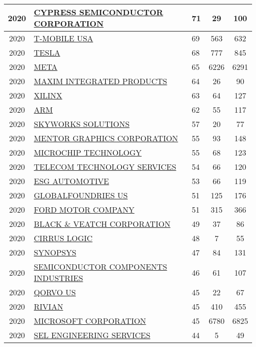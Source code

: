 \documentclass{article}%
\begin{document}
\begin{longtable}{c|p{20em}|p{5em}|c|c}
\hline%
2020&\hyperref[subsec:CYPRESSSEMICONDUCTORCORPORATION]{CYPRESS SEMICONDUCTOR CORPORATION}&71&29&100\\%
\hline%
2020&\hyperref[subsec:T{-}MOBILEUSA]{T{-}MOBILE USA}&69&563&632\\%
\hline%
2020&\hyperref[subsec:TESLA]{TESLA}&68&777&845\\%
\hline%
2020&\hyperref[subsec:META]{META}&65&6226&6291\\%
\hline%
2020&\hyperref[subsec:MAXIMINTEGRATEDPRODUCTS]{MAXIM INTEGRATED PRODUCTS}&64&26&90\\%
\hline%
2020&\hyperref[subsec:XILINX]{XILINX}&63&64&127\\%
\hline%
2020&\hyperref[subsec:ARM]{ARM}&62&55&117\\%
\hline%
2020&\hyperref[subsec:SKYWORKSSOLUTIONS]{SKYWORKS SOLUTIONS}&57&20&77\\%
\hline%
2020&\hyperref[subsec:MENTORGRAPHICSCORPORATION]{MENTOR GRAPHICS CORPORATION}&55&93&148\\%
\hline%
2020&\hyperref[subsec:MICROCHIPTECHNOLOGY]{MICROCHIP TECHNOLOGY}&55&68&123\\%
\hline%
2020&\hyperref[subsec:TELECOMTECHNOLOGYSERVICES]{TELECOM TECHNOLOGY SERVICES}&54&66&120\\%
\hline%
2020&\hyperref[subsec:ESGAUTOMOTIVE]{ESG AUTOMOTIVE}&53&66&119\\%
\hline%
2020&\hyperref[subsec:GLOBALFOUNDRIESUS]{GLOBALFOUNDRIES US}&51&125&176\\%
\hline%
2020&\hyperref[subsec:FORDMOTORCOMPANY]{FORD MOTOR COMPANY}&51&315&366\\%
\hline%
2020&\hyperref[subsec:BLACKVEATCHCORPORATION]{BLACK \& VEATCH CORPORATION}&49&37&86\\%
\hline%
2020&\hyperref[subsec:CIRRUSLOGIC]{CIRRUS LOGIC}&48&7&55\\%
\hline%
2020&\hyperref[subsec:SYNOPSYS]{SYNOPSYS}&47&84&131\\%
\hline%
2020&\hyperref[subsec:SEMICONDUCTORCOMPONENTSINDUSTRIES]{SEMICONDUCTOR COMPONENTS INDUSTRIES}&46&61&107\\%
\hline%
2020&\hyperref[subsec:QORVOUS]{QORVO US}&45&22&67\\%
\hline%
2020&\hyperref[subsec:RIVIAN]{RIVIAN}&45&410&455\\%
\hline%
2020&\hyperref[subsec:MICROSOFTCORPORATION]{MICROSOFT CORPORATION}&45&6780&6825\\%
\hline%
2020&\hyperref[subsec:SELENGINEERINGSERVICES]{SEL ENGINEERING SERVICES}&44&5&49\\%

\end{longtable}
\end{document}
